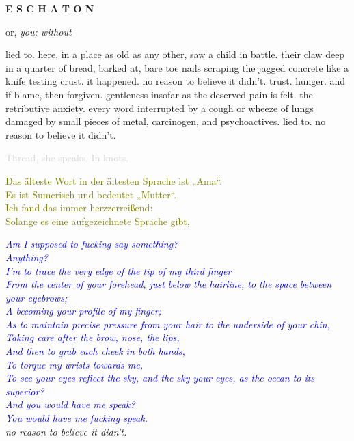 \documentclass[11pt]{article}
\begin{document}
\begingroup
\begin{center}
\huge \textbf{E S C H A T O N}
\end{center}
\endgroup

\begingroup
\begin{center}
or, \textit{you; without}
\end{center}
\endgroup

\vspace*{2\baselineskip}

\begingroup
lied to. here, in a place as old as any other, saw a child in battle. their claw deep in a quarter of bread, barked at, bare toe nails scraping the jagged concrete like a knife testing crust. it happened. no reason to believe it didn't. trust. hunger. and if blame, then forgiven. gentleness insofar as the deserved pain is felt. the retributive anxiety. every word interrupted by a cough or wheeze of lungs damaged by small pieces of metal, carcinogen, and psychoactives. lied to. no reason to believe it didn't.
\endgroup

\begingroup
\begin{center}
\textcolor{lightgray}{Thread, she speaks. In knots.}
\rightskip\leftskip
\end{center}
\endgroup

\begingroup
\begin{center}
\textcolor{olive}{Das älteste Wort in der ältesten Sprache ist „Ama“. \\ Es ist Sumerisch und bedeutet „Mutter“. \\ Ich fand das immer herzzerreißend: \\ Solange es eine aufgezeichnete Sprache gibt,}
\end{center}
\endgroup

\begingroup
\begin{center}
\textit{\textcolor{blue}{Am I supposed to fucking say something? \\ Anything? \\ I'm to trace the very edge of the tip of my third finger \\ From the center of your forehead, just below the hairline, to the space between your eyebrows; \\ A becoming your profile of my finger; \\ As to maintain precise pressure from your hair to the underside of your chin, \\ Taking care after the brow, nose, the lips, \\ And then to grab each cheek in both hands, \\ To torque my wrists towards me, \\ To see your eyes reflect the sky, and the sky your eyes, as the ocean to its superior? \\ And you would have me speak? \\ You would have me fucking speak.} \\ no reason to believe it didn't. }
\end{center}
\endgroup
\end{document}
